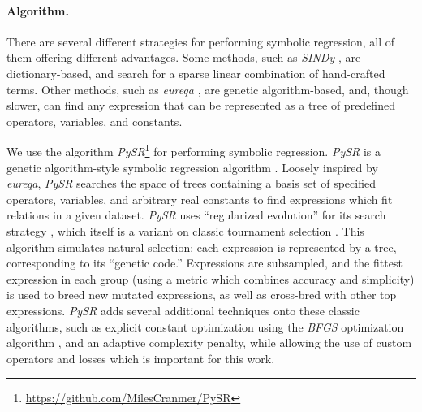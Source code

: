 \documentclass[nohyperref]{article}
\newcommand\pysr{\textit{PySR}\xspace}
\theoremstyle{plain}
\theoremstyle{definition}
\theoremstyle{remark}
\begin{document}
\paragraph{Algorithm.}
There are several different strategies for performing symbolic regression, all of them offering different advantages.
Some methods, such as \textit{SINDy} \cite{bruntonDiscoveringGoverningEquations2016}, are dictionary-based, and search for a sparse linear combination of hand-crafted terms.
Other methods, such as \textit{eureqa} \cite{schmidtDistillingFreeFormNatural2009}, are genetic algorithm-based, and, though slower, can find any expression that can be represented as a tree of predefined operators, variables, and constants.

We use the algorithm \pysr\footnote{\url{https://github.com/MilesCranmer/PySR}} \cite{cranmerPySRFastParallelized2020} for performing symbolic regression.
\pysr is a genetic algorithm-style symbolic regression algorithm
\citep[see][for an early example]{kozaGeneticProgrammingMeans1994}.
Loosely inspired by \textit{eureqa},
\pysr searches the space of trees 
containing a basis set of specified operators, variables, and arbitrary real constants
to find expressions which fit relations in a given dataset.
\pysr uses ``regularized evolution'' for its search strategy 
\cite{realRegularizedEvolutionImage2019,realAutoMLZeroEvolvingMachine2020},
which itself is a variant on classic tournament selection
\cite{brindleGeneticAlgorithmsFunction1980,goldbergComparativeAnalysisSelection1991}.
This algorithm simulates natural selection: each expression is represented by a tree, corresponding to its ``genetic code.''
Expressions are subsampled, and the fittest expression in each group (using a metric which combines accuracy and simplicity) is used to breed new mutated expressions, as well as cross-bred with other top expressions.
\pysr adds several additional techniques onto these classic algorithms, such as explicit constant optimization using the \textit{BFGS} optimization algorithm \cite{fletcherPracticalMethodsOptimization1988}, and an adaptive complexity penalty, while allowing the use of custom operators and losses which is important for this work.
\end{document}
